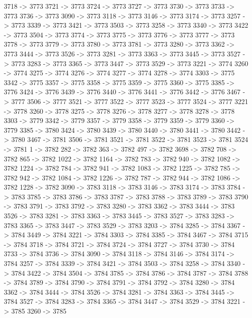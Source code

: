 {	3718 -> 3773
	3721 -> 3773
	3724 -> 3773
	3727 -> 3773
	3730 -> 3773
	3733 -> 3773
	3736 -> 3773
	3090 -> 3773
	3118 -> 3773
	3146 -> 3773
	3174 -> 3773
	3257 -> 3773
	3339 -> 3773
	3421 -> 3773
	3503 -> 3773
	3258 -> 3773
	3340 -> 3773
	3422 -> 3773
	3504 -> 3773
	3774 -> 3773
	3775 -> 3773
	3776 -> 3773
	3777 -> 3773
	3778 -> 3773
	3779 -> 3773
	3780 -> 3773
	3781 -> 3773
	3280 -> 3773
	3362 -> 3773
	3444 -> 3773
	3526 -> 3773
	3281 -> 3773
	3363 -> 3773
	3445 -> 3773
	3527 -> 3773
	3283 -> 3773
	3365 -> 3773
	3447 -> 3773
	3529 -> 3773
	3221 -> 3774
	3260 -> 3774
	3275 -> 3774
	3276 -> 3774
	3277 -> 3774
	3278 -> 3774
	3303 -> 3775
	3342 -> 3775
	3357 -> 3775
	3358 -> 3775
	3359 -> 3775
	3360 -> 3775
	3385 -> 3776
	3424 -> 3776
	3439 -> 3776
	3440 -> 3776
	3441 -> 3776
	3442 -> 3776
	3467 -> 3777
	3506 -> 3777
	3521 -> 3777
	3522 -> 3777
	3523 -> 3777
	3524 -> 3777
	3221 -> 3778
	3260 -> 3778
	3275 -> 3778
	3276 -> 3778
	3277 -> 3778
	3278 -> 3778
	3303 -> 3779
	3342 -> 3779
	3357 -> 3779
	3358 -> 3779
	3359 -> 3779
	3360 -> 3779
	3385 -> 3780
	3424 -> 3780
	3439 -> 3780
	3440 -> 3780
	3441 -> 3780
	3442 -> 3780
	3467 -> 3781
	3506 -> 3781
	3521 -> 3781
	3522 -> 3781
	3523 -> 3781
	3524 -> 3781
	1 -> 3782
	282 -> 3782
	363 -> 3782
	497 -> 3782
	3698 -> 3782
	708 -> 3782
	865 -> 3782
	1022 -> 3782
	1164 -> 3782
	783 -> 3782
	940 -> 3782
	1082 -> 3782
	1224 -> 3782
	784 -> 3782
	941 -> 3782
	1083 -> 3782
	1225 -> 3782
	785 -> 3782
	942 -> 3782
	1084 -> 3782
	1226 -> 3782
	787 -> 3782
	944 -> 3782
	1086 -> 3782
	1228 -> 3782
	3090 -> 3783
	3118 -> 3783
	3146 -> 3783
	3174 -> 3783
	3784 -> 3783
	3785 -> 3783
	3786 -> 3783
	3787 -> 3783
	3788 -> 3783
	3789 -> 3783
	3790 -> 3783
	3791 -> 3783
	3792 -> 3783
	3280 -> 3783
	3362 -> 3783
	3444 -> 3783
	3526 -> 3783
	3281 -> 3783
	3363 -> 3783
	3445 -> 3783
	3527 -> 3783
	3283 -> 3783
	3365 -> 3783
	3447 -> 3783
	3529 -> 3783
	3203 -> 3784
	3285 -> 3784
	3367 -> 3784
	3449 -> 3784
	3221 -> 3784
	3303 -> 3784
	3385 -> 3784
	3467 -> 3784
	3715 -> 3784
	3718 -> 3784
	3721 -> 3784
	3724 -> 3784
	3727 -> 3784
	3730 -> 3784
	3733 -> 3784
	3736 -> 3784
	3090 -> 3784
	3118 -> 3784
	3146 -> 3784
	3174 -> 3784
	3257 -> 3784
	3339 -> 3784
	3421 -> 3784
	3503 -> 3784
	3258 -> 3784
	3340 -> 3784
	3422 -> 3784
	3504 -> 3784
	3785 -> 3784
	3786 -> 3784
	3787 -> 3784
	3788 -> 3784
	3789 -> 3784
	3790 -> 3784
	3791 -> 3784
	3792 -> 3784
	3280 -> 3784
	3362 -> 3784
	3444 -> 3784
	3526 -> 3784
	3281 -> 3784
	3363 -> 3784
	3445 -> 3784
	3527 -> 3784
	3283 -> 3784
	3365 -> 3784
	3447 -> 3784
	3529 -> 3784
	3221 -> 3785
	3260 -> 3785
}
